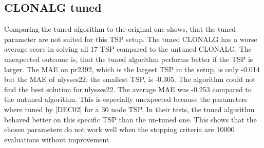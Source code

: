 \subsection{CLONALG tuned}
Comparing the tuned algorithm to the original one shows, that the tuned parameter are not suited for this TSP setup. The tuned CLONALG has a worse average score in solving all 17 TSP compared to the untuned CLONALG. The unexpected outcome is, that the tuned algorithm performs better if the TSP is larger. The MAE on pr2392, which is the largest TSP in the setup, is only -0.014 but the MAE of ulysses22, the smallest TSP, is -0.305. The algorithm could not find the best solution for ulysses22. The average MAE was -0.253 compared to the untuned algorithm. This is especially unexpected because the parameters where tuned by [DEC02] for a 30 node TSP. In their tests, the tuned algorithm behaved better on this specific TSP than the un-tuned one. This shows that the chosen parameters do not work well when the stopping criteria are 10000 evaluations without improvement.
